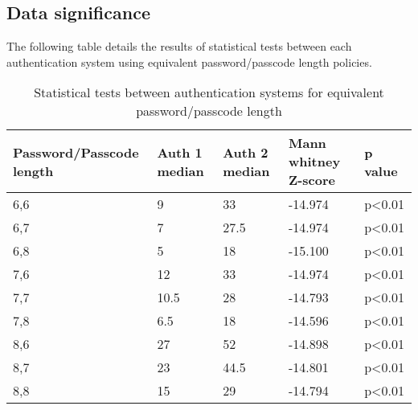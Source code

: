 \documentclass[british,10pt,a4paper]{article}
\begin{document}
\begin{appendices}
  	\subsection{Data significance}
  	\label{app:significant_stats}
  	The following table details the results of statistical tests between each authentication system using equivalent password/passcode length policies.
  	\begin{table}[h]
	\centering
	\begin{tabular}{|l|l|l|l|l|}
	\hline
	Password/Passcode length & Auth 1 median & Auth 2 median & Mann whitney Z-score & p value \\ \hline
	6,6 & 9 & 33 & -14.974 & p\textless0.01 \\ \hline
	6,7 & 7 & 27.5 & -14.974 & p\textless0.01 \\ \hline
	6,8 & 5 & 18 & -15.100 & p\textless0.01 \\ \hline
	7,6 & 12 & 33 & -14.974 & p\textless0.01 \\ \hline
	7,7 & 10.5 & 28 & -14.793 & p\textless0.01 \\ \hline
	7,8 & 6.5 & 18 & -14.596 & p\textless0.01 \\ \hline
	8,6 & 27 & 52 & -14.898 & p\textless0.01 \\ \hline
	8,7 & 23 & 44.5 & -14.801 & p\textless0.01 \\ \hline
	8,8 & 15 & 29 & -14.794 & p\textless0.01 \\ \hline
	\end{tabular}
	\caption{Statistical tests between authentication systems for equivalent password/passcode length}
	\label{tab:significance}
	\end{table}
\end{appendices}
\clearpage
\end{document}
